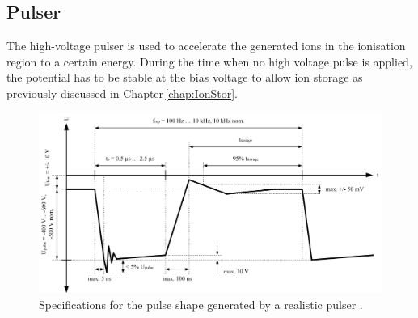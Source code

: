 	\subsection{Pulser }
	The high-voltage pulser is used to accelerate the generated ions in the ionisation region to a certain energy. During the time when no high voltage pulse is applied, the potential has to be stable at the bias voltage to allow ion storage as previously discussed in Chapter\,\ref{chap:IonStor}.\\
	\begin{figure}[H]
		\centering
		\includegraphics[width=\textwidth]{Bilder/Pulser_theretical_shape.jpg}
		\caption{Specifications for the pulse shape generated by a realistic pulser \cite{Diss_Meyer}.}
		\label{fig:PulserTheoCurve}
	\end{figure}
